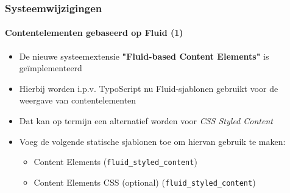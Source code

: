 \begin{frame}[fragile]
	\frametitle{Systeemwijzigingen}
	\framesubtitle{Contentelementen gebaseerd op Fluid (1)}

	\begin{itemize}

		\item De nieuwe systeemextensie \textbf{"Fluid-based Content Elements"} is geïmplementeerd

		\item Hierbij worden i.p.v. TypoScript nu Fluid-sjablonen gebruikt voor de weergave van contentelementen

		\item Dat kan op termijn een alternatief worden voor \textit{CSS Styled Content}

		\item Voeg de volgende statische sjablonen toe om hiervan gebruik te maken:

			\begin{itemize}
				\item Content Elements (\texttt{fluid\_styled\_content})
				\item Content Elements CSS (optional) (\texttt{fluid\_styled\_content})
			\end{itemize}

	\end{itemize}

\end{frame}




